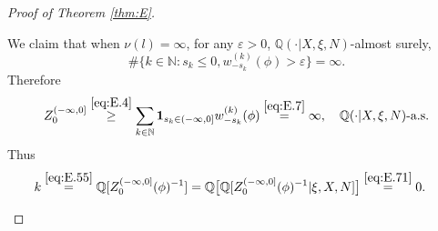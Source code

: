 \documentclass[12pt,a4paper]{amsart}
\numberwithin{equation}{section}
\theoremstyle{plain}
\theoremstyle{definition}
\theoremstyle{remark}
\newenvironment{proof*}[1][\proofname]{
	\renewcommand\qedsymbol{\rule{3mm}{3mm}}
	\begin{proof}[#1]}{\end{proof}}
\begin{document}
\begin{proof}[Proof of Theorem \ref{thm:E}]
\begin{proof*}
	We claim that when $\nu(l) = \infty$, for any $\varepsilon>0$, $\mathbb Q(\cdot | X, \xi, N)$-almost surely, 
\begin{equation} \label{eq:E.7}
	\#\{k\in \mathbb N: s_k\leq 0, w_{-s_k}^{(k)}(\phi)> \varepsilon\} =\infty.
\end{equation} 
	Therefore
\begin{equation} \label{eq:E.71}
	Z_0^{(-\infty, 0]} \overset{\eqref{eq:E.4}}\geq \sum_{k\in \mathbb N} \mathbf 1_{s_k \in (-\infty, 0]}  w^{(k)}_{-s_k}(\phi) 
	\overset{\eqref{eq:E.7}}= \infty, \quad \mathbb Q(\cdot | X, \xi, N)\text{-a.s.}
\end{equation}
	Thus
\begin{align} 
& k \overset{\eqref{eq:E.55}}= \mathbb Q[Z^{(-\infty,0]}_0(\phi)^{-1}] 
=\mathbb Q\big[\mathbb Q[Z^{(-\infty,0]}_0(\phi)^{-1}| \xi, X, N]\big]  \overset{\eqref{eq:E.71}}= 0. \qedhere
\end{align}
\end{proof*}


\end{proof}
\end{document}
